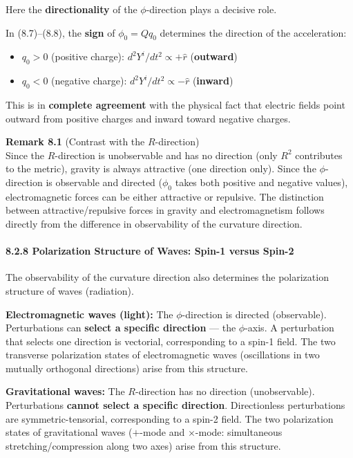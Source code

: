 \documentclass[a4paper,11pt]{article}
\theoremstyle{definition}
\begin{document}
Here the \textbf{directionality} of the \(\phi\)-direction plays a decisive role.

In (8.7)--(8.8), the \textbf{sign} of \(\phi_0 = Qq_0\) determines the direction of the acceleration:

\begin{itemize}
\tightlist
\item
  \(q_0 > 0\) (positive charge): \(d^2Y^i/dt^2 \propto +\hat{r}\) (\textbf{outward})
\item
  \(q_0 < 0\) (negative charge): \(d^2Y^i/dt^2 \propto -\hat{r}\) (\textbf{inward})
\end{itemize}

This is in \textbf{complete agreement} with the physical fact that electric fields point outward from positive charges and inward toward negative charges.

\textbf{Remark 8.1} (Contrast with the \(R\)-direction)\\
Since the \(R\)-direction is unobservable and has no direction (only \(R^2\) contributes to the metric), gravity is always attractive (one direction only). Since the \(\phi\)-direction is observable and directed (\(\phi_0\) takes both positive and negative values), electromagnetic forces can be either attractive or repulsive. The distinction between attractive/repulsive forces in gravity and electromagnetism follows directly from the difference in observability of the curvature direction.

\paragraph{8.2.8 Polarization Structure of Waves: Spin-1 versus Spin-2}\label{polarization-structure-of-waves-spin-1-versus-spin-2}

The observability of the curvature direction also determines the polarization structure of waves (radiation).

\textbf{Electromagnetic waves (light):} The \(\phi\)-direction is directed (observable). Perturbations can \textbf{select a specific direction} --- the \(\phi\)-axis. A perturbation that selects one direction is vectorial, corresponding to a spin-1 field. The two transverse polarization states of electromagnetic waves (oscillations in two mutually orthogonal directions) arise from this structure.

\textbf{Gravitational waves:} The \(R\)-direction has no direction (unobservable). Perturbations \textbf{cannot select a specific direction}. Directionless perturbations are symmetric-tensorial, corresponding to a spin-2 field. The two polarization states of gravitational waves (\(+\)-mode and \(\times\)-mode: simultaneous stretching/compression along two axes) arise from this structure.
\end{document}
